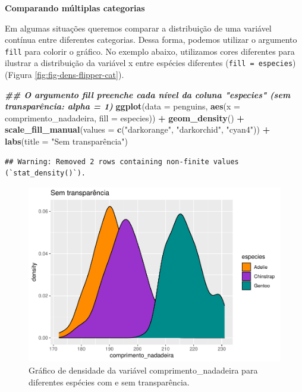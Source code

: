 \documentclass[
]{article}
\newenvironment{Shaded}{\begin{snugshade}}{\end{snugshade}}
\newcommand{\AttributeTok}[1]{\textcolor[rgb]{0.13,0.29,0.53}{#1}}
\newcommand{\DocumentationTok}[1]{\textcolor[rgb]{0.56,0.35,0.01}{\textbf{\textit{#1}}}}
\newcommand{\FunctionTok}[1]{\textcolor[rgb]{0.13,0.29,0.53}{\textbf{#1}}}
\newcommand{\NormalTok}[1]{#1}
\newcommand{\SpecialCharTok}[1]{\textcolor[rgb]{0.81,0.36,0.00}{\textbf{#1}}}
\newcommand{\StringTok}[1]{\textcolor[rgb]{0.31,0.60,0.02}{#1}}
\begin{document}
\textbf{Comparando múltiplas categorias}

Em algumas situações queremos comparar a distribuição de uma variável contínua entre diferentes categorias. Dessa forma, podemos utilizar o argumento \texttt{fill} para colorir o gráfico. No exemplo abaixo, utilizamos cores diferentes para ilustrar a distribuição da variável x entre espécies diferentes (\texttt{fill\ =\ especies}) (Figura \ref{fig:fig-dens-flipper-cat}).

\begin{Shaded}
\begin{Highlighting}[]
\DocumentationTok{\#\# O argumento fill preenche cada nível da coluna "especies" (sem transparência: alpha = 1)}
\FunctionTok{ggplot}\NormalTok{(}\AttributeTok{data =}\NormalTok{ penguins, }\FunctionTok{aes}\NormalTok{(}\AttributeTok{x =}\NormalTok{ comprimento\_nadadeira, }\AttributeTok{fill =}\NormalTok{ especies)) }\SpecialCharTok{+}
    \FunctionTok{geom\_density}\NormalTok{() }\SpecialCharTok{+}
    \FunctionTok{scale\_fill\_manual}\NormalTok{(}\AttributeTok{values =} \FunctionTok{c}\NormalTok{(}\StringTok{"darkorange"}\NormalTok{, }\StringTok{"darkorchid"}\NormalTok{, }\StringTok{"cyan4"}\NormalTok{)) }\SpecialCharTok{+}
    \FunctionTok{labs}\NormalTok{(}\AttributeTok{title =} \StringTok{"Sem transparência"}\NormalTok{)}
\end{Highlighting}
\end{Shaded}

\begin{verbatim}
## Warning: Removed 2 rows containing non-finite values (`stat_density()`).
\end{verbatim}

\begin{figure}
\includegraphics[width=0.75\linewidth,height=0.75\textheight]{epr_files/figure-latex/fig-dens-flipper-cat-1} \caption{Gráfico de densidade da variável comprimento_nadadeira para diferentes espécies com e sem transparência.}\label{fig:fig-dens-flipper-cat-1}
\end{figure}
\end{document}
